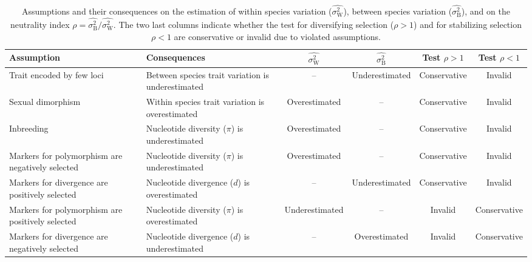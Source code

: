 \documentclass{article}
\newcommand{\RateBetween}{\sigma^2_{\mathrm{B}}}
\newcommand{\RateWhithin}{\sigma^2_{\mathrm{W}}}
\newcommand{\EstRateBetween}{\widehat{\RateBetween}}
\newcommand{\EstRateWhithin}{\widehat{\RateWhithin}}
\newcommand{\NI}{\rho}
\begin{document}
\begin{table*}[t!]
    \centering
    \begin{adjustbox}{width = 1.0\textwidth}
        \begin{tabular}{||l|l||c|c||c|c||}
            \hline
            Assumption                                       & Consequences                                       & $\EstRateWhithin$   & $\EstRateBetween$   & Test $\NI > 1$ & Test $\NI < 1$ \\ \hline \hline
            Trait encoded by few loci                        & Between species trait variation is underestimated & --              & Underestimated & Conservative & Invalid  \\ \hline
            Sexual dimorphism                                & Within species trait variation is overestimated   & Overestimated & -- & Conservative & Invalid  \\ \hline
            Inbreeding                                       & Nucleotide diversity ($\pi$) is underestimated    & Overestimated  & --              & Conservative & Invalid  \\ \hline
            Markers for polymorphism are negatively selected & Nucleotide diversity ($\pi$) is underestimated  & Overestimated & -- & Conservative & Invalid  \\ \hline
            Markers for divergence are positively selected   & Nucleotide divergence ($d$) is overestimated & -- & Underestimated & Conservative & Invalid  \\ \hline
            Markers for polymorphism are positively selected & Nucleotide diversity ($\pi$) is overestimated  & Underestimated & -- & Invalid & Conservative  \\ \hline
            Markers for divergence are negatively selected   & Nucleotide divergence ($d$) is underestimated & -- & Overestimated & Invalid & Conservative  \\ \hline
        \end{tabular}
    \end{adjustbox}
    \caption{Assumptions and their consequences on the estimation of within species variation ($\EstRateWhithin$), between species variation ($\EstRateBetween$), and on the neutrality index $\NI = \EstRateBetween/\EstRateWhithin$.
    The two last columns indicate whether the test for diversifying selection ($\NI > 1$) and for stabilizing selection $\NI < 1$ are conservative or invalid due to violated assumptions.
    }
    \label{table:assumptions}
\end{table*}
\end{document}
